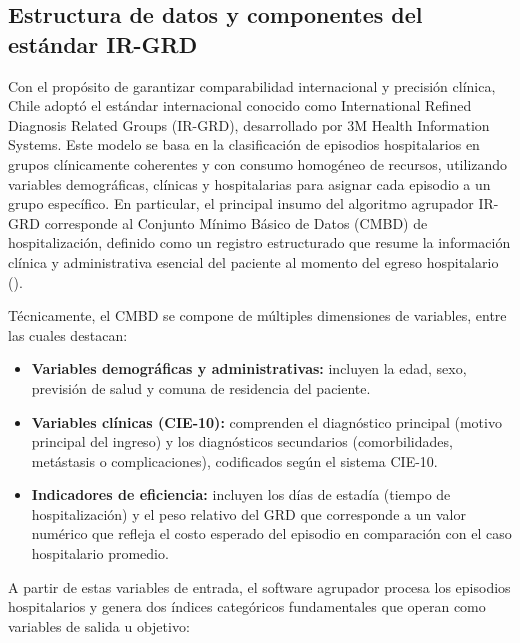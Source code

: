 

\subsection{Estructura de datos y componentes del estándar IR-GRD}

Con el propósito de garantizar comparabilidad internacional y precisión clínica, Chile adoptó el estándar internacional conocido como International Refined Diagnosis Related Groups (IR-GRD), desarrollado por 3M Health Information Systems. Este modelo se basa en la clasificación de episodios hospitalarios en grupos clínicamente coherentes y con consumo homogéneo de recursos, utilizando variables demográficas, clínicas y hospitalarias para asignar cada episodio a un grupo específico. En particular, el principal insumo del algoritmo agrupador IR-GRD corresponde al Conjunto Mínimo Básico de Datos (CMBD) de hospitalización, definido como un registro estructurado que resume la información clínica y administrativa esencial del paciente al momento del egreso hospitalario (\cite{minsal2018_cmbd}).


Técnicamente, el CMBD se compone de múltiples dimensiones de variables, entre las cuales destacan:

\begin{itemize}
    \item \textbf{Variables demográficas y administrativas:} incluyen la edad, sexo, previsión de salud y comuna de residencia del paciente.
    \item \textbf{Variables clínicas (CIE-10):} comprenden el diagnóstico principal (motivo principal del ingreso) y los diagnósticos secundarios (comorbilidades, metástasis o complicaciones), codificados según el sistema CIE-10.
    \item \textbf{Indicadores de eficiencia:} incluyen los días de estadía (tiempo de hospitalización) y el peso relativo del GRD que corresponde a un valor numérico que refleja el costo esperado del episodio en comparación con el caso hospitalario promedio.
\end{itemize}

A partir de estas variables de entrada, el software agrupador procesa los episodios hospitalarios y genera dos índices categóricos fundamentales que operan como variables de salida u objetivo:



